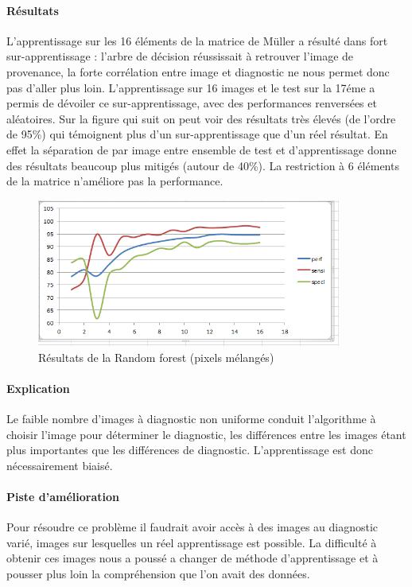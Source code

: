 \documentclass[a4paper,10pt]{report}
\begin{document}
\paragraph{Résultats}
L'apprentissage sur les 16 éléments de la matrice de Müller a résulté dans fort sur-apprentissage : l'arbre de décision réussissait à retrouver l'image de provenance, la forte corrélation entre image et diagnostic ne nous permet donc pas d'aller plus loin. L'apprentissage sur 16 images et le test sur la 17éme a permis de dévoiler ce sur-apprentissage, avec des performances renversées et aléatoires. Sur la figure qui suit on peut voir des résultats très élevés (de l'ordre de 95\%) qui témoignent plus d'un sur-apprentissage que d'un réel résultat. En effet la séparation de par image entre ensemble de test et d'apprentissage donne des résultats beaucoup plus mitigés (autour de 40\%). La restriction à 6 éléments de la matrice n'améliore pas la performance. 
\begin{figure}[htbp]
  \caption{Résultats de la Random forest (pixels mélangés)}
  \centering
  \includegraphics[width=10cm]{RandomForestPerf.png}
\end{figure}
\paragraph{Explication}
Le faible nombre d'images à diagnostic non uniforme conduit l'algorithme à choisir l'image pour déterminer le diagnostic, les différences entre les images étant plus importantes que les différences de diagnostic. L'apprentissage est donc nécessairement biaisé. 
\paragraph{Piste d'amélioration}
Pour résoudre ce problème il faudrait avoir accès à des images au diagnostic varié, images sur lesquelles un réel apprentissage est possible. La difficulté à obtenir ces images nous a poussé a changer de méthode d'apprentissage et à pousser plus loin la compréhension que l'on avait des données.
\end{document}
